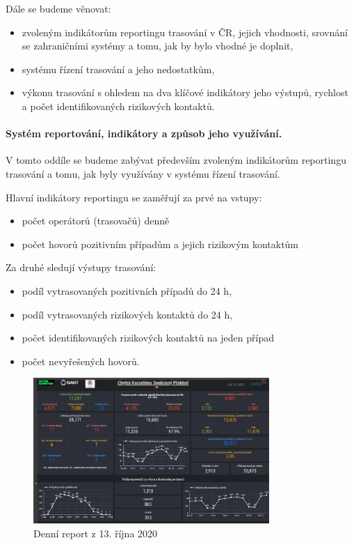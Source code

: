 Dále se budeme věnovat:
\begin{itemize}
\item zvoleným indikátorům reportingu trasování v ČR, jejich vhodnosti, srovnání se zahraničními systémy a tomu, jak by bylo vhodné je doplnit,
\item systému řízení trasování a jeho nedostatkům,
\item výkonu trasování s ohledem na dva klíčové indikátory jeho výstupů, rychlost a počet identifikovaných rizikových kontaktů.
\end{itemize}


\paragraph{Systém reportování, indikátory a způsob jeho využívání.} V tomto oddíle se budeme zabývat především zvoleným indikátorům reportingu trasování a tomu, jak byly využívány v systému řízení trasování.

Hlavní indikátory reportingu se zaměřují za prvé na vstupy:
\begin{itemize}
\item počet operátorů (trasovačů) denně
\item počet hovorů pozitivním případům a jejich rizikovým kontaktům
\end{itemize}

Za druhé sledují výstupy trasování:
\begin{itemize}
\item podíl vytrasovaných pozitivních případů do 24 h,
\item podíl vytrasovaných rizikových kontaktů do 24 h,
\item počet identifikovaných rizikových kontaktů na jeden případ
\item počet nevyřešených hovorů.
\end{itemize}

\begin{figure}[ht]
    \centering
    \includegraphics[width=0.8\textwidth]{./pic/daktela.jpg}
    \caption{Denní report z 13. října 2020}
    \label{fig:daktela}
\end{figure}



